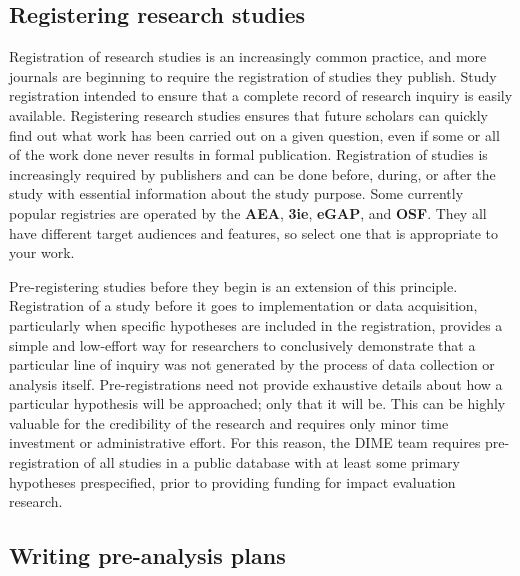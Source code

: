 \subsection{Registering research studies}

Registration of research studies is an increasingly common practice,
and more journals are beginning to require
the registration of studies they publish.
Study registration intended to ensure that a complete record of research inquiry is easily available.
Registering research studies ensures that future scholars can quickly
find out what work has been carried out on a given question,
even if some or all of the work done never results in formal publication.
Registration of studies is increasingly required by publishers
and can be done before, during, or after the study
with essential information about the study purpose.
Some currently popular registries are operated by the
\textbf{AEA},
\textbf{3ie},
\textbf{eGAP},
and \textbf{OSF}.
They all have different target audiences and features,
so select one that is appropriate to your work.

Pre-registering studies before they begin is an extension of this principle.
Registration of a study before it goes to implementation or data acquisition,
particularly when specific hypotheses are included in the registration,
provides a simple and low-effort way for researchers
to conclusively demonstrate that a particular line of inquiry
was not generated by the process of data collection or analysis itself.
Pre-registrations need not provide exhaustive details about how
a particular hypothesis will be approached; only that it will be.
This can be highly valuable for the credibility of the research
and requires only minor time investment or administrative effort.
For this reason, the DIME team requires pre-registration of all studies
in a public database with at least some primary hypotheses prespecified,
prior to providing funding for impact evaluation research.

\subsection{Writing pre-analysis plans}

